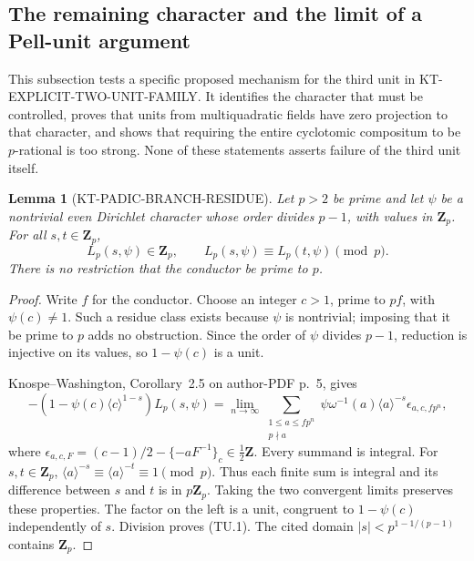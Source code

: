 \documentclass[11pt,a4paper]{article}
\newtheorem{lemma}[theorem]{Lemma}
\theoremstyle{definition}
\begin{document}


\subsection{The remaining character and the limit of a Pell-unit argument}
\label{sec:kt-third-unit-character}

This subsection tests a specific proposed mechanism for the third unit in
KT-EXPLICIT-TWO-UNIT-FAMILY.  It identifies the character that must be
controlled, proves that units from multiquadratic fields have zero
projection to that character, and shows that requiring the entire
cyclotomic compositum to be $p$-rational is too strong.  None of these
statements asserts failure of the third unit itself.

\begin{lemma}[KT-PADIC-BRANCH-RESIDUE]
Let $p>2$ be prime and let $\psi$ be a nontrivial even Dirichlet
character whose order divides $p-1$, with values in $\mathbf Z_p$.
For all $s,t\in\mathbf Z_p$,
\[
 L_p(s,\psi)\in\mathbf Z_p,\qquad
 L_p(s,\psi)\equiv L_p(t,\psi)\pmod p.                 \tag{TU.1}
\]
There is no restriction that the conductor be prime to $p$.
\end{lemma}
\begin{proof}
Write $f$ for the conductor.  Choose an integer $c>1$, prime to $pf$,
with $\psi(c)\ne1$.  Such a residue class exists because $\psi$ is
nontrivial; imposing that it be prime to $p$ adds no obstruction.
Since the order of $\psi$ divides $p-1$, reduction is injective on its
values, so $1-\psi(c)$ is a unit.

Knospe--Washington, Corollary~2.5 on author-PDF p.~5, gives
\[
 -(1-\psi(c)\langle c\rangle^{1-s})L_p(s,\psi)
 =\lim_{n\to\infty}\sum_{\substack{1\le a\le fp^n\\p\nmid a}}
     \psi\omega^{-1}(a)\langle a\rangle^{-s}
     \epsilon_{a,c,fp^n},                                  \tag{TU.2}
\]
where
$\epsilon_{a,c,F}=(c-1)/2-\{-aF^{-1}\}_c\in\tfrac12\mathbf Z$.
Every summand is integral.  For $s,t\in\mathbf Z_p$,
$\langle a\rangle^{-s}\equiv\langle a\rangle^{-t}\equiv1\pmod p$.
Thus each finite sum is integral and its difference between $s$ and
$t$ is in $p\mathbf Z_p$.  Taking the two convergent limits preserves
these properties.  The factor on the left is a unit, congruent to
$1-\psi(c)$ independently of $s$.  Division proves (TU.1).
The cited domain $|s|<p^{1-1/(p-1)}$ contains $\mathbf Z_p$.
\end{proof}
\end{document}
